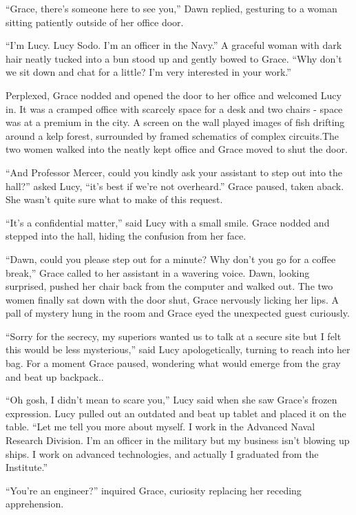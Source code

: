 \documentclass[12pt]{article} %
\begin{document}
``Grace, there's someone here to see you,'' Dawn replied, gesturing to a woman sitting patiently outside of her office door.

``I'm Lucy. Lucy Sodo. I'm an officer in the Navy.'' A graceful woman with dark hair neatly tucked into a bun stood up and gently bowed to Grace. ``Why don't we sit down and chat for a little? I'm very interested in your work.''

Perplexed, Grace nodded and opened the door to her office and welcomed Lucy in. It was a cramped office with scarcely space for a desk and two chairs - space was at a premium in the city. A screen on the wall played images of fish drifting around a kelp forest, surrounded by framed schematics of complex circuits.The two women walked into the neatly kept office and Grace moved to shut the door.

``And Professor Mercer, could you kindly ask your assistant to step out into the hall?'' asked Lucy, ``it's best if we're not overheard.'' Grace paused, taken aback. She wasn't quite sure what to make of this request.

``It's a confidential matter,'' said Lucy with a small smile. Grace nodded and stepped into the hall, hiding the confusion from her face.

``Dawn, could you please step out for a minute? Why don't you go for a coffee break,'' Grace called to her assistant in a wavering voice. Dawn, looking surprised, pushed her chair back from the computer and walked out. The two women finally sat down with the door shut, Grace nervously licking her lips. A pall of mystery hung in the room and Grace eyed the unexpected guest curiously.

``Sorry for the secrecy, my superiors wanted us to talk at a secure site but I felt this would be less mysterious,'' said Lucy apologetically, turning to reach into her bag. For a moment Grace paused, wondering what would emerge from the gray and beat up backpack..

``Oh gosh, I didn't mean to scare you,'' Lucy said when she saw Grace's frozen expression. Lucy pulled out an outdated and beat up tablet and placed it on the table. ``Let me tell you more about myself. I work in the Advanced Naval Research Division. I'm an officer in the military but my business isn't blowing up ships. I work on advanced technologies, and actually I graduated from the Institute.''

``You're an engineer?'' inquired Grace, curiosity replacing her receding apprehension.
\end{document}
